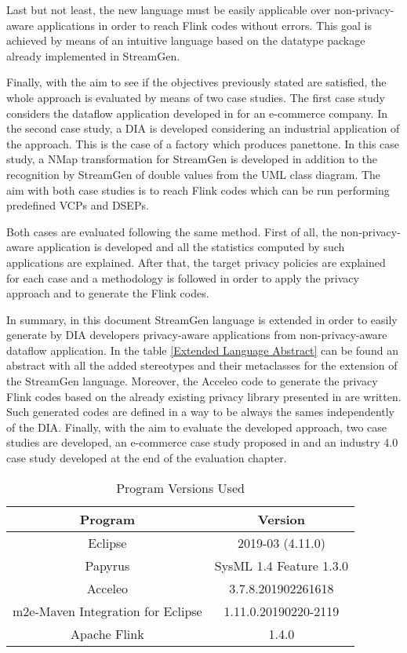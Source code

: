 Last but not least, the new language must be easily applicable over non-privacy-aware applications in order to reach Flink codes without errors. This goal is achieved by means of an intuitive language based on the datatype package already implemented in StreamGen.

Finally, with the aim to see if the objectives previously stated are satisfied, the whole approach is evaluated by means of two case studies. The first case study considers the dataflow application developed in \cite{privacypoliciesarticle} for an e-commerce company. In the second case study, a DIA is developed considering an industrial application of the approach. This is the case of a factory which produces panettone. In this case study, a NMap transformation for StreamGen is developed in addition to the recognition by StreamGen of double values from the UML class diagram. The aim with both case studies is to reach Flink codes which can be run performing predefined VCPs and DSEPs.

Both cases are evaluated following the same method. First of all, the non-privacy-aware application is developed and all the statistics computed by such applications are explained. After that,  the target privacy policies are explained for each case and a methodology is followed in order to apply the privacy approach and to generate the Flink codes.

In summary, in this document StreamGen language is extended in order to easily generate by DIA developers privacy-aware applications from non-privacy-aware dataflow application. In the table \ref{Extended Language Abstract} can be found an abstract with all the added stereotypes and their metaclasses for the extension of the StreamGen language. Moreover, the Acceleo code to generate the privacy Flink codes based on the already existing privacy library presented in \cite{privacypoliciesarticle} are written. Such generated codes are defined in a way to be always the sames independently of the DIA. Finally, with the aim to evaluate the developed approach, two case studies are developed, an e-commerce case study proposed in \cite{privacypoliciesarticle} and an industry 4.0 case study developed at the end of the evaluation chapter.

\begin{table}[h!]
\centering
	\begin{tabular}{||c|c||} 
	\hline\hline
	Program & Version \\ [1ex] 
	\hline\hline
	Eclipse & 2019-03 (4.11.0)  \\
	\hline
	Papyrus & SysML 1.4 Feature 1.3.0  \\
	\hline
	Acceleo & 3.7.8.201902261618  \\
	\hline
	m2e-Maven Integration for Eclipse & 1.11.0.20190220-2119  \\
	\hline
	Apache Flink & 1.4.0  \\
	\hline\hline
	\end{tabular}
\caption{Program Versions Used}
\label{Program Versions Used}
\end{table}

